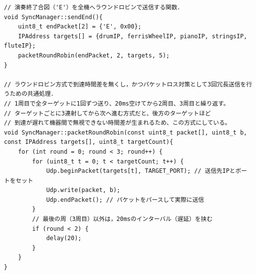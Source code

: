 \begin{lstlisting}[caption={SyncManager.cpp}, label={lst:siki_sync_cpp}]
// 演奏終了合図（'E'）を全機へラウンドロビンで送信する関数．
void SyncManager::sendEnd(){
    uint8_t endPacket[2] = {'E', 0x00};
    IPAddress targets[] = {drumIP, ferrisWheelIP, pianoIP, stringsIP, fluteIP};
    packetRoundRobin(endPacket, 2, targets, 5);
}

// ラウンドロビン方式で到達時間差を無くし，かつパケットロス対策として3回冗長送信を行うための共通処理．
// 1周目で全ターゲットに1回ずつ送り、20ms空けてから2周目、3周目と繰り返す。
// ターゲットごとに3連射してから次へ進む方式だと、後方のターゲットほど
// 到達が遅れて機器間で無視できない時間差が生まれるため、この方式にしている。
void SyncManager::packetRoundRobin(const uint8_t packet[], uint8_t b, const IPAddress targets[], uint8_t targetCount){
    for (int round = 0; round < 3; round++) {
        for (uint8_t t = 0; t < targetCount; t++) {
            Udp.beginPacket(targets[t], TARGET_PORT); // 送信先IPとポートをセット
            Udp.write(packet, b);
            Udp.endPacket(); // パケットをパースして実際に送信
        }
        // 最後の周（3周目）以外は，20msのインターバル（遅延）を挟む
        if (round < 2) {
            delay(20);
        }
    }
}
\end{lstlisting}
